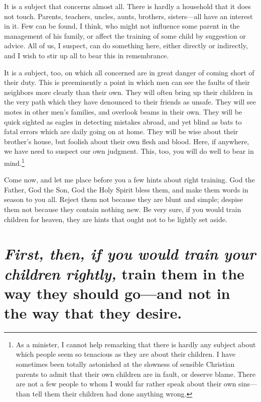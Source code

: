 \documentclass[
]{book}
\begin{document}
It is a subject that concerns almost all. There is hardly a household that it does not touch. Parents, teachers, uncles, aunts, brothers, sisters---all have an interest in it. Few can be found, I think, who might not influence some parent in the management of his family, or affect the training of some child by suggestion or advice. All of us, I suspect, can do something here, either directly or indirectly, and I wish to stir up all to bear this in remembrance.

It is a subject, too, on which all concerned are in great danger of coming short of their duty. This is preeminently a point in which men can see the faults of their neighbors more clearly than their own. They will often bring up their children in the very path which they have denounced to their friends as unsafe. They will see motes in other men's families, and overlook beams in their own. They will be quick sighted as eagles in detecting mistakes abroad, and yet blind as bats to fatal errors which are daily going on at home. They will be wise about their brother's house, but foolish about their own flesh and blood. Here, if anywhere, we have need to suspect our own judgment. This, too, you will do well to bear in mind.\footnote{As a minister, I cannot help remarking that there is hardly any subject about which people seem so tenacious as they are about their children. I have sometimes been totally astonished at the slowness of sensible Christian parents to admit that their own children are in fault, or deserve blame. There are not a few people to whom I would far rather speak about their own sins---than tell them their children had done anything wrong.}

Come now, and let me place before you a few hints about right training. God the Father, God the Son, God the Holy Spirit bless them, and make them words in season to you all. Reject them not because they are blunt and simple; despise them not because they contain nothing new. Be very sure, if you would train children for heaven, they are hints that ought not to be lightly set aside.

\hypertarget{first-then-if-you-would-train-your-children-rightly-train-them-in-the-way-they-should-goand-not-in-the-way-that-they-desire.}{%
\chapter{\texorpdfstring{\emph{First, then, if you would train your children rightly,} train them in the way they should go---and not in the way that they desire.}{First, then, if you would train your children rightly, train them in the way they should go---and not in the way that they desire.}}\label{first-then-if-you-would-train-your-children-rightly-train-them-in-the-way-they-should-goand-not-in-the-way-that-they-desire.}}
\end{document}
